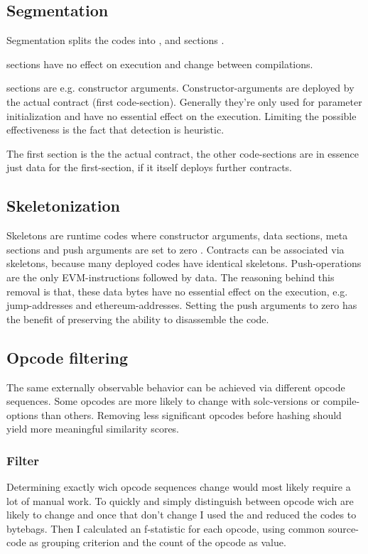 \documentclass[../main.tex]{subfiles}
\begin{document}
\subsection{Segmentation}
Segmentation splits the codes into ,  and  sections \cite{ethutils}.

 sections have no effect on execution and change between compilations.

 sections are e.g. constructor arguments.
Constructor-arguments are deployed by the actual contract (first code-section).
Generally they're only used for parameter initialization and have no essential effect on the execution.
Limiting the possible effectiveness is the fact that detection is heuristic.

The first  section is the the actual contract, the other code-sections are in essence just data for the first-section, if it itself deploys further contracts.

\subsection{Skeletonization}
Skeletons are runtime codes where constructor arguments, data sections, meta sections and push arguments are set to zero \cite{ethutils}.
Contracts can be associated via skeletons, because many deployed codes have identical skeletons.
Push-operations are the only EVM-instructions followed by data.
The reasoning behind this removal is that, these data bytes have no essential effect on the execution, e.g. jump-addresses and ethereum-addresses.
Setting the push arguments to zero has the benefit of preserving the ability to disassemble the code.

\subsection{Opcode filtering}
The same externally observable behavior can be achieved via different opcode sequences.
Some opcodes are more likely to change with solc-versions or compile-options than others.
Removing less significant opcodes before hashing should yield more meaningful similarity scores.

\subsubsection{ Filter\cite{ethereum-contract-similarity}}
Determining exactly wich opcode sequences change would most likely require a lot of manual work.
To quickly and simply distinguish between opcode wich are likely to change and once that don't change I used the  \cite{solc-versions-testset} and reduced the codes to bytebags. Then I calculated an f-statistic  for each opcode, using common source-code as grouping criterion and the count of the opcode as value.
\end{document}
